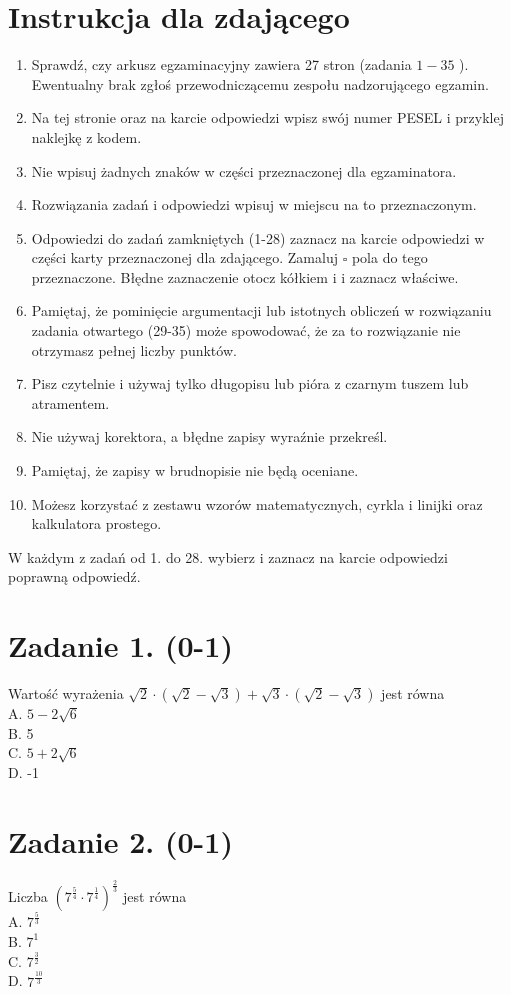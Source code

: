 \documentclass[10pt]{article}
\begin{document}
\section*{Instrukcja dla zdającego}
\begin{enumerate}
  \item Sprawdź, czy arkusz egzaminacyjny zawiera 27 stron (zadania \(1-35\) ). Ewentualny brak zgłoś przewodniczącemu zespołu nadzorującego egzamin.
  \item Na tej stronie oraz na karcie odpowiedzi wpisz swój numer PESEL i przyklej naklejkę z kodem.
  \item Nie wpisuj żadnych znaków w części przeznaczonej dla egzaminatora.
  \item Rozwiązania zadań i odpowiedzi wpisuj w miejscu na to przeznaczonym.
  \item Odpowiedzi do zadań zamkniętych (1-28) zaznacz na karcie odpowiedzi w części karty przeznaczonej dla zdającego. Zamaluj \(\square\) pola do tego przeznaczone. Błędne zaznaczenie otocz kółkiem i i zaznacz właściwe.
  \item Pamiętaj, że pominięcie argumentacji lub istotnych obliczeń w rozwiązaniu zadania otwartego (29-35) może spowodować, że za to rozwiązanie nie otrzymasz pełnej liczby punktów.
  \item Pisz czytelnie i używaj tylko długopisu lub pióra z czarnym tuszem lub atramentem.
  \item Nie używaj korektora, a błędne zapisy wyraźnie przekreśl.
  \item Pamiętaj, że zapisy w brudnopisie nie będą oceniane.
  \item Możesz korzystać z zestawu wzorów matematycznych, cyrkla i linijki oraz kalkulatora prostego.
\end{enumerate}

W każdym z zadań od 1. do 28. wybierz i zaznacz na karcie odpowiedzi poprawną odpowiedź.

\section*{Zadanie 1. (0-1)}
Wartość wyrażenia \(\sqrt{2} \cdot(\sqrt{2}-\sqrt{3})+\sqrt{3} \cdot(\sqrt{2}-\sqrt{3})\) jest równa\\
A. \(5-2 \sqrt{6}\)\\
B. 5\\
C. \(5+2 \sqrt{6}\)\\
D. -1

\section*{Zadanie 2. (0-1)}
Liczba \(\left(7^{\frac{5}{4}} \cdot 7^{\frac{1}{4}}\right)^{\frac{2}{3}}\) jest równa\\
A. \(7^{\frac{5}{3}}\)\\
B. \(7^{1}\)\\
C. \(7^{\frac{3}{2}}\)\\
D. \(7^{\frac{10}{3}}\)
\end{document}
